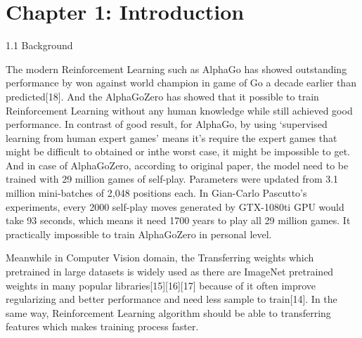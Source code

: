 \documentclass[12pt,a4paper]{article}
\begin{document}
\section*{Chapter 1: Introduction}
{\large 1.1 Background \par\vspace{0.1cm}}
{
The modern Reinforcement Learning such as AlphaGo has showed outstanding performance by won against world champion in game of Go a decade earlier than predicted\cite{GovsCom}[18]. And the AlphaGoZero has showed that it possible to train Reinforcement Learning without any human knowledge while still achieved good performance\cite{AlphaGoZero}\cite{AlphaZero}. In contrast of good result, for AlphaGo, by using ‘supervised learning from human expert games’\cite{AlphaGo} means it's require the expert games that might be difficult to obtained or inthe worst case, it might be impossible to get. And in case of AlphaGoZero, according to original paper\cite{AlphaGoZero}, the model need to be trained with 29 million games of self-play. Parameters were updated from 3.1 million mini-batches of 2,048 positions each. In Gian-Carlo Pascutto's experiments, every 2000 self-play moves generated by GTX-1080ti GPU would take 93 seconds, which means it need 1700 years to play all 29 million games\cite{GCP}. It practically impossible to train AlphaGoZero in personal level.\par
}
{
Meanwhile in Computer Vision domain, the Transferring weights which pretrained in large datasets is widely used as there are ImageNet\cite{Imagenet} pretrained weights in many popular libraries[15][16][17] because of it often improve regularizing and better performance and need less sample to train[14]. In the same way, Reinforcement Learning algorithm should be able to transferring features which makes training process faster.
}
\clearpage


\end{document}
